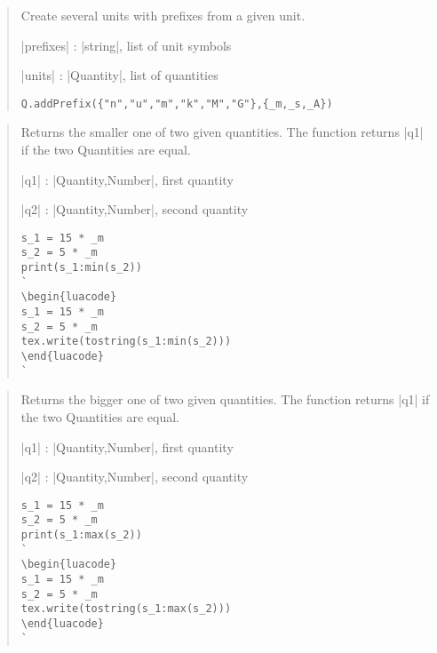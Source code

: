 \documentclass{ltxdoc}
\begin{document}
\begin{quote}
  Create several units with prefixes from a given unit.

  \begin{description}
  \item |prefixes| : |string|, list of unit symbols

  \item |units| : |Quantity|, list of quantities
  \end{description}


\begin{lstlisting}
Q.addPrefix({"n","u","m","k","M","G"},{_m,_s,_A})
\end{lstlisting}
\end{quote}



\begin{quote}
  Returns the smaller one of two given quantities. The function returns |q1| if the two Quantities are equal.

  \begin{description}
  \item |q1| : |Quantity,Number|, first quantity

  \item |q2| : |Quantity,Number|, second quantity
  \end{description}


\begin{lstlisting}
s_1 = 15 * _m
s_2 = 5 * _m
print(s_1:min(s_2))
`
\begin{luacode}
s_1 = 15 * _m
s_2 = 5 * _m
tex.write(tostring(s_1:min(s_2)))
\end{luacode}
`
\end{lstlisting}
\end{quote}


\begin{quote}
  Returns the bigger one of two given quantities.  The function returns |q1| if the two Quantities are equal.

  \begin{description}
  \item |q1| : |Quantity,Number|, first quantity

  \item |q2| : |Quantity,Number|, second quantity
  \end{description}


\begin{lstlisting}
s_1 = 15 * _m
s_2 = 5 * _m
print(s_1:max(s_2))
`
\begin{luacode}
s_1 = 15 * _m
s_2 = 5 * _m
tex.write(tostring(s_1:max(s_2)))
\end{luacode}
`
\end{lstlisting}
\end{quote}
\end{document}
